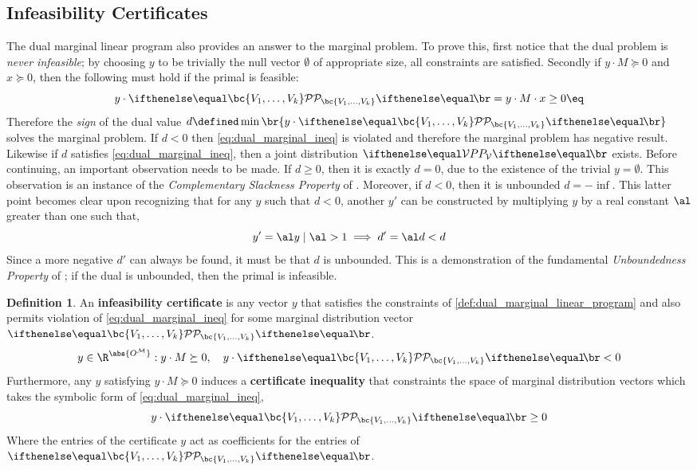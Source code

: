 \documentclass[aps, 10pt, english, twoside, pra, nofootinbib, longbibliography]{revtex4-1}
\theoremstyle{plain}
\theoremstyle{definition}
\newtheorem{definition}[theorem]{Definition}
\theoremstyle{remark}
\newcommand{\term}[1]{\textcolor{Mahogany}{\textbf{#1}}}
\begin{document}
    \subsection{Infeasibility Certificates}
    The dual marginal linear program also provides an answer to the marginal problem. To prove this, first notice that the dual problem is \textit{never infeasible}; by choosing $y$ to be trivially the null vector $\emptyset$ of appropriate size, all constraints are satisfied. Secondly if $y \cdot M \succeq 0$ and $x \succeq 0$, then the following must hold if the primal is feasible:
    \[ y \cdot \probvec[\bc{V_1, \ldots, V_k}] =  y \cdot M \cdot x \geq 0 \eq \label{eq:dual_marginal_ineq} \]
    Therefore the \textit{sign} of the dual value $d \defined \min \br{y \cdot \probvec[\bc{V_1, \ldots, V_k}]}$ solves the marginal problem. If $d < 0$ then \cref{eq:dual_marginal_ineq} is violated and therefore the marginal problem has negative result. Likewise if $d$ satisfies \cref{eq:dual_marginal_ineq}, then a joint distribution $\prob[\mathcal{V}]$ exists. Before continuing, an important observation needs to be made. If $d \geq 0$, then it is exactly $d = 0$, due to the existence of the trivial $y = \emptyset$. This observation is an instance of the \textit{Complementary Slackness Property} of \cite{Bradley_1977}.  Moreover, if $d < 0$, then it is unbounded $d = -\inf$. This latter point becomes clear upon recognizing that for any $y$ such that $d < 0$, another $y'$ can be constructed by multiplying $y$ by a real constant $\al$ greater than one such that,
    \[ y' = \al y \mid \al > 1 \implies d' = \al d < d \]
    Since a more negative $d'$ can always be found, it must be that $d$ is unbounded. This is a demonstration of the fundamental \textit{Unboundedness Property} of \cite{Bradley_1977}; if the dual is unbounded, then the primal is infeasible.


    \begin{definition} An \term{infeasibility certificate} is any vector $y$ that satisfies the constraints of \cref{def:dual_marginal_linear_program} and also permits violation of \cref{eq:dual_marginal_ineq} for some marginal distribution vector $\probvec[\bc{V_1, \ldots, V_k}]$.
    \[ y \in \R^{\abs{O^{\mathcal{M}}}} : y \cdot M \succeq 0, \quad y \cdot \probvec[\bc{V_1, \ldots, V_k}] < 0 \]
    Furthermore, any $y$ satisfying $y \cdot M \succeq 0$ induces a \term{certificate inequality} that constraints the space of marginal distribution vectors which takes the symbolic form of \cref{eq:dual_marginal_ineq},
    \[ y \cdot \probvec[\bc{V_1, \ldots, V_k}] \geq 0 \]
    Where the entries of the certificate $y$ act as coefficients for the entries of $\probvec[\bc{V_1, \ldots, V_k}]$.
    \end{definition}
\end{document}
